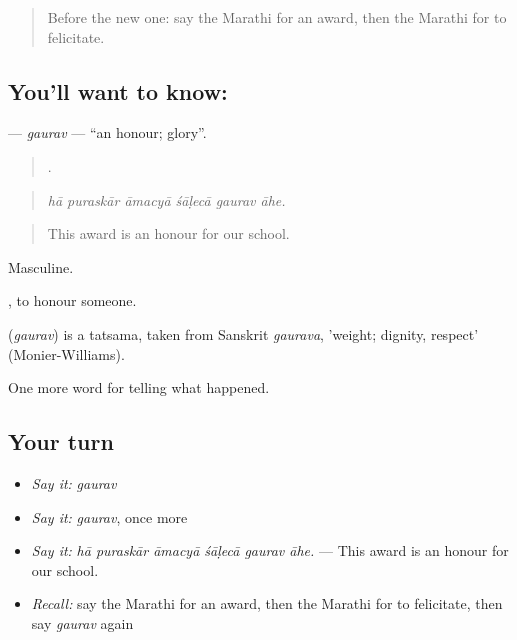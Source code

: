 \label{lesson:MR-C322-gaurav}



\begin{quote}
Before the new one: say the Marathi for an award, then the Marathi for to felicitate.
\end{quote}

\subsection*{You'll want to know: }
\textbf{} — \emph{gaurav} — \textquotedblleft{}an honour; glory\textquotedblright{}.

\begin{quote}
     .
\end{quote}

\begin{quote}
\emph{hā puraskār āmacyā śāḷecā gaurav āhe.}
\end{quote}

\begin{quote}
This award is an honour for our school.
\end{quote}

Masculine.

 , to honour someone.

\begin{cousinweb}
\textbf{} (\emph{gaurav}) is a tatsama, taken from Sanskrit \emph{gaurava}, 'weight; dignity, respect' (Monier-Williams).
\end{cousinweb}

\begin{grammarlens}[title={What you've built}]
One more word for telling what happened.
\end{grammarlens}

\subsection*{Your turn}
\begin{itemize}
\raggedright
  \item \emph{Say it:} \emph{gaurav}
  \item \emph{Say it:} \emph{gaurav}, once more
  \item \emph{Say it:} \emph{hā puraskār āmacyā śāḷecā gaurav āhe.} — This award is an honour for our school.
  \item \emph{Recall:} say the Marathi for an award, then the Marathi for to felicitate, then say \emph{gaurav} again
\end{itemize}

